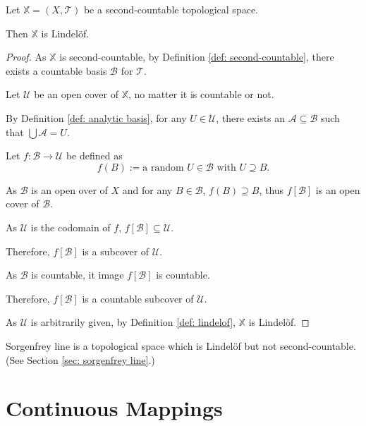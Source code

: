 \begin{proposition}
	\label{prop: second-countable space is lindelof}
	Let $\mathbb X = (X, \mathcal T)$ be a second-countable topological space.
	
	Then $\mathbb X$ is Lindel\"of.
	
	\begin{proof}
		As $\mathbb X$ is second-countable, by Definition \ref{def: second-countable}, there exists a countable basis $\mathcal B$ for $\mathcal T$.
		
		Let $\mathcal U$ be an open cover of $\mathbb X$, no matter it is countable or not.
		
		By Definition \ref{def: analytic basis}, for any $U \in \mathcal U$, there exists an $\mathcal A \subseteq \mathcal B$ such that $\bigcup \mathcal A = U$.
		
		Let $f: \mathcal B \to \mathcal U$ be defined as
		$$
		f(B) := \text{a random $U \in \mathcal B$ with $U \supseteq B$}.
		$$
		
		As $\mathcal B$ is an open over of $X$ and for any $B \in \mathcal B$, $f(B) \supseteq B$, thus $f[\mathcal B]$ is an open cover of $\mathcal B$.
		
		As $\mathcal U$ is the codomain of $f$, $f[\mathcal B] \subseteq \mathcal U$.
		
		Therefore, $f[\mathcal B]$ is a subcover of $\mathcal U$.
		
		As $\mathcal B$ is countable, it image $f[\mathcal B]$ is countable.
		
		Therefore, $f[\mathcal B]$ is a countable subcover of $\mathcal U$.
		
		As $\mathcal U$ is arbitrarily given, by Definition \ref{def: lindelof}, $\mathbb X$ is Lindel\"of.
\end{proof}
\end{proposition}


\begin{example}
	Sorgenfrey line is a topological space which is Lindel\"of but not second-countable. (See Section \ref{sec: sorgenfrey line}.)
\end{example}



\chapter{Continuous Mappings}


